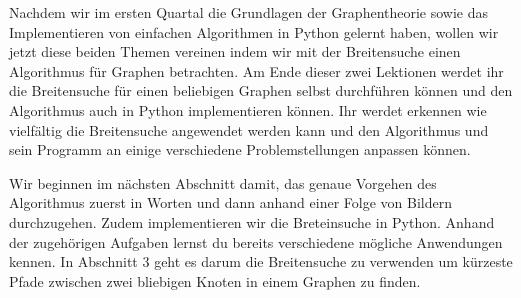 Nachdem wir im ersten Quartal die Grundlagen der Graphentheorie sowie das Implementieren von einfachen Algorithmen in Python gelernt haben, wollen wir jetzt diese beiden Themen vereinen indem wir mit der Breitensuche einen Algorithmus für Graphen betrachten. Am Ende dieser zwei Lektionen werdet ihr die Breitensuche für einen beliebigen Graphen selbst durchführen können und den Algorithmus auch in Python implementieren können. Ihr werdet erkennen wie vielfältig die Breitensuche angewendet werden kann und den Algorithmus und sein Programm an einige verschiedene Problemstellungen anpassen können.

Wir beginnen im nächsten Abschnitt damit, das genaue Vorgehen des Algorithmus zuerst in Worten und dann anhand einer Folge von Bildern durchzugehen. Zudem implementieren wir die Breteinsuche in Python. Anhand der zugehörigen Aufgaben lernst du bereits verschiedene mögliche Anwendungen kennen.  In Abschnitt 3 geht es darum die Breitensuche zu verwenden um kürzeste Pfade zwischen zwei bliebigen Knoten in einem Graphen zu finden.